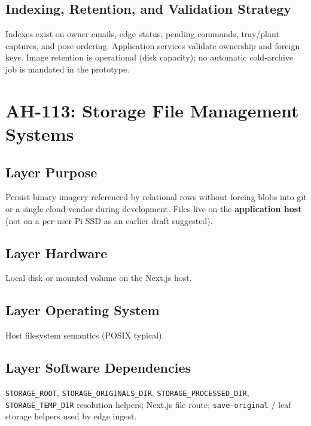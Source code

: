 \documentclass[11pt,letterpaper]{article}
\begin{document}
\subsection{Indexing, Retention, and Validation Strategy}
Indexes exist on owner emails, edge status, pending commands, tray/plant captures, and pose
ordering. Application services validate ownership and foreign keys. Image retention is
operational (disk capacity); no automatic cold-archive job is mandated in the prototype.

\section{AH-113: Storage File Management Systems}

\subsection{Layer Purpose}
Persist binary imagery referenced by relational rows without forcing blobs into git or a single
cloud vendor during development. Files live on the \textbf{application host} (not on a
per-user Pi SSD as an earlier draft suggested).

\subsection{Layer Hardware}
Local disk or mounted volume on the Next.js host.

\subsection{Layer Operating System}
Host filesystem semantics (POSIX typical).

\subsection{Layer Software Dependencies}
\texttt{STORAGE\_ROOT}, \texttt{STORAGE\_ORIGINALS\_DIR}, \texttt{STORAGE\_PROCESSED\_DIR},
\texttt{STORAGE\_TEMP\_DIR} resolution helpers; Next.js file route;
\texttt{save-original} / leaf storage helpers used by edge ingest.
\end{document}
